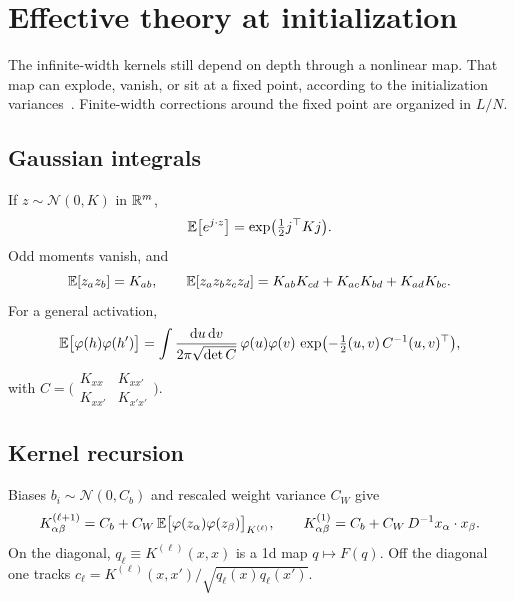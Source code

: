 \section{Effective theory at initialization}
\label{sec:crit}

The infinite-width kernels still depend on depth through a nonlinear map. That map can explode, vanish, or sit at a fixed point, according to the initialization variances~\cite{roberts2022pdlt}. Finite-width corrections around the fixed point are organized in $L/N$.

\subsection{Gaussian integrals}

If $z\sim\mathcal{N}(0,K)$ in $\mathbb{R}^{m}$,
\begin{equation}
  \mathbb{E}\bigl[e^{j\cdot z}\bigr]
  =\exp\bigl(\tfrac12 j^\top K j\bigr).
  \label{eq:gauss-gen}
\end{equation}
Odd moments vanish, and
\begin{equation}
  \mathbb{E}[z_{a}z_{b}]=K_{ab},
  \qquad
  \mathbb{E}[z_{a}z_{b}z_{c}z_{d}]
  =K_{ab}K_{cd}+K_{ac}K_{bd}+K_{ad}K_{bc}.
  \label{eq:wick}
\end{equation}
For a general activation,
\begin{equation}
  \mathbb{E}\bigl[\varphi(h)\varphi(h')\bigr]
  =\int\frac{\mathrm{d} u\,\mathrm{d} v}{2\pi\sqrt{\det C}}\,
  \varphi(u)\varphi(v)\,
  \exp\bigl(-\tfrac12 (u,v)\,C^{-1}(u,v)^\top\bigr),
  \label{eq:2d-gauss}
\end{equation}
with $C=\bigl(\begin{smallmatrix}K_{xx}&K_{xx'}\\ K_{xx'}&K_{x'x'}\end{smallmatrix}\bigr)$.

\subsection{Kernel recursion}

Biases $b_i\sim\mathcal{N}(0,C_b)$ and rescaled weight variance $C_W$ give
\begin{equation}
  K^{(\ell+1)}_{\alpha\beta}
  =C_b+C_W\,\mathbb{E}\bigl[\varphi(z_\alpha)\varphi(z_\beta)\bigr]_{K^{(\ell)}},
  \qquad
  K^{(1)}_{\alpha\beta}
  =C_b+C_W\,D^{-1}x_\alpha\cdot x_\beta.
  \label{eq:K-rec}
\end{equation}
On the diagonal, $q_\ell\equiv K^{(\ell)}(x,x)$ is a 1d map $q\mapsto F(q)$. Off the diagonal one tracks $c_\ell=K^{(\ell)}(x,x')/\sqrt{q_\ell(x)q_\ell(x')}$.

